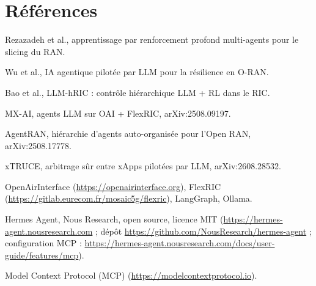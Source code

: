\documentclass[11pt,a4paper]{article}
\begin{document}
\section*{Références}
\small
\begin{enumerate}[label={[\arabic*]}]
  \item Rezazadeh et al., apprentissage par renforcement profond multi-agents pour le slicing du RAN.
  \item Wu et al., IA agentique pilotée par LLM pour la résilience en O-RAN.
  \item Bao et al., LLM-hRIC : contrôle hiérarchique LLM + RL dans le RIC.
  \item MX-AI, agents LLM sur OAI + FlexRIC, arXiv:2508.09197.
  \item AgentRAN, hiérarchie d'agents auto-organisée pour l'Open RAN, arXiv:2508.17778.
  \item xTRUCE, arbitrage sûr entre xApps pilotées par LLM, arXiv:2608.28532.
  \item OpenAirInterface (\url{https://openairinterface.org}), FlexRIC (\url{https://gitlab.eurecom.fr/mosaic5g/flexric}), LangGraph, Ollama.
  \item Hermes Agent, Nous Research, open source, licence MIT (\url{https://hermes-agent.nousresearch.com} ; dépôt \url{https://github.com/NousResearch/hermes-agent} ;
        configuration MCP : \url{https://hermes-agent.nousresearch.com/docs/user-guide/features/mcp}).
  \item Model Context Protocol (MCP) (\url{https://modelcontextprotocol.io}).
\end{enumerate}
\end{document}
